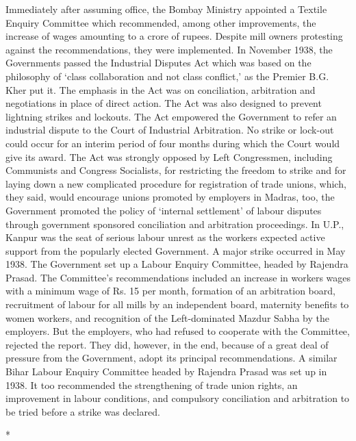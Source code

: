 \begin{multicols}{2}
Immediately after assuming office, the Bombay Ministry appointed a Textile Enquiry Committee which recommended, among other improvements, the increase of wages amounting to a crore of rupees. Despite mill owners protesting against the recommendations, they were implemented. In November 1938, the Governments passed the Industrial Disputes Act which was based on the philosophy of `class collaboration and not class conflict,' as the Premier B.G. Kher put it. The emphasis in the Act was on conciliation, arbitration and negotiations in place of direct action. The Act was also designed to prevent lightning strikes and lockouts. The Act empowered the Government to refer an industrial dispute to the Court of Industrial Arbitration. No strike or lock-out could occur for an interim period of four months during which the Court would give its award. The Act was strongly opposed by Left Congressmen, including Communists and Congress Socialists, for restricting the freedom to strike and for laying down a new complicated procedure for registration of trade unions, which, they said, would encourage unions promoted by employers in Madras, too, the Government promoted the policy of `internal settlement' of labour disputes through government sponsored conciliation and arbitration proceedings. In U.P., Kanpur was the seat of serious labour unrest as the workers expected active support from the popularly elected Government. A major strike occurred in May 1938. The Government set up a Labour Enquiry Committee, headed by Rajendra Prasad. The Committee's recommendations included an increase in workers wages with a minimum wage of Rs. 15 per month, formation of an arbitration board, recruitment of labour for all mills by an independent board, maternity benefits to women workers, and recognition of the Left-dominated Mazdur Sabha by the employers. But the employers, who had refused to cooperate with the Committee, rejected the report. They did, however, in the end, because of a great deal of pressure from the Government, adopt its principal recommendations. A similar Bihar Labour Enquiry Committee headed by Rajendra Prasad was set up in 1938. It too recommended the strengthening of trade union rights, an improvement in labour conditions, and compulsory conciliation and arbitration to be tried before a strike was declared.

\begin{center}*\end{center}


\end{multicols}
